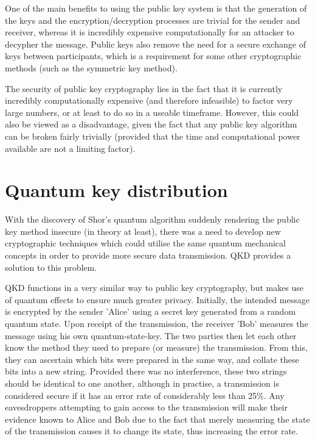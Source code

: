 \documentclass[runningheads,a4paper]{llncs}
\begin{document}
One of the main benefits to using the public key system is that the generation of the keys and the encryption/decryption processes are trivial for the sender and receiver, whereas it is incredibly expensive computationally for an attacker to decypher the message. Public keys also remove the need for a secure exchange of keys between participants, which is a requirement for some other cryptographic methods (such as the symmetric key method).

The security of public key cryptography lies in the fact that it is currently incredibly computationally expensive (and therefore infeasible) to factor very large numbers, or at least to do so in a useable timeframe. However, this could also be viewed as a disadvantage, given the fact that any public key algorithm can be broken fairly trivially (provided that the time and computational power available are not a limiting factor).

\section{Quantum key distribution}

With the discovery of Shor's quantum algorithm suddenly rendering the public key method insecure (in theory at least), there was a need to develop new cryptographic techniques which could utilise the same quantum mechanical concepts in order to provide more secure data transmission. QKD provides a solution to this problem.

QKD functions in a very similar way to public key cryptography, but makes use of quantum effects to ensure much greater privacy. Initially, the intended message is encrypted by the sender 'Alice' using a secret key generated from a random quantum state. Upon receipt of the transmission, the receiver 'Bob' measures the message using his own quantum-state-key. The two parties then let each other know the method they used to prepare (or measure) the transmission. From this, they can ascertain which bits were prepared in the same way, and collate these bits into a new string. Provided there was no interference, these two strings should be identical to one another, although in practise, a transmission is considered secure if it has an error rate of considerably less than 25\%\cite{Steane:1997zr}. Any eavesdroppers attempting to gain access to the transmission will make their evidence known to Alice and Bob due to the fact that merely measuring the state of the transmission causes it to change its state, thus increasing the error rate.
\end{document}
